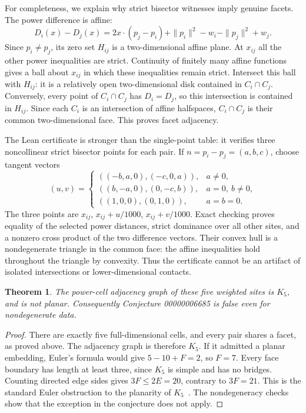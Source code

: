 \documentclass[11pt]{article}
\newtheorem{theorem}{Theorem}
\begin{document}
For completeness, we explain why strict bisector witnesses imply genuine facets. The power difference is affine:
\[
D_i(x)-D_j(x)=2x\cdot(p_j-p_i)
 +\|p_i\|^2-w_i-\|p_j\|^2+w_j.
\]
Since $p_i\ne p_j$, its zero set $H_{ij}$ is a two-dimensional affine plane. At $x_{ij}$ all the other power inequalities are strict. Continuity of finitely many affine functions gives a ball about $x_{ij}$ in which these inequalities remain strict. Intersect this ball with $H_{ij}$: it is a relatively open two-dimensional disk contained in $C_i\cap C_j$. Conversely, every point of $C_i\cap C_j$ has $D_i=D_j$, so this intersection is contained in $H_{ij}$. Since each $C_i$ is an intersection of affine halfspaces, $C_i\cap C_j$ is their common two-dimensional face. This proves facet adjacency.

The Lean certificate is stronger than the single-point table: it verifies three noncollinear strict bisector points for each pair. If $n=p_i-p_j=(a,b,c)$, choose tangent vectors
\[
(u,v)=
\begin{cases}
((-b,a,0),(-c,0,a)),&a\ne0,\\
((b,-a,0),(0,-c,b)),&a=0,\ b\ne0,\\
((1,0,0),(0,1,0)),&a=b=0.
\end{cases}
\]
The three points are $x_{ij}$, $x_{ij}+u/1000$, $x_{ij}+v/1000$.
Exact checking proves equality of the selected power distances, strict dominance over all other sites, and a nonzero cross product of the two difference vectors. Their convex hull is a nondegenerate triangle in the common face: the affine inequalities hold throughout the triangle by convexity. Thus the certificate cannot be an artifact of isolated intersections or lower-dimensional contacts.

\begin{theorem}
The power-cell adjacency graph of these five weighted sites is $K_5$, and is not planar. Consequently Conjecture 00000006685 is false even for nondegenerate data.
\end{theorem}
\begin{proof}
There are exactly five full-dimensional cells, and every pair shares a facet, as proved above. The adjacency graph is therefore $K_5$. If it admitted a planar embedding, Euler's formula would give $5-10+F=2$, so $F=7$. Every face boundary has length at least three, since $K_5$ is simple and has no bridges. Counting directed edge sides gives $3F\le2E=20$, contrary to $3F=21$. This is the standard Euler obstruction to the planarity of $K_5$~\cite{mit}. The nondegeneracy checks show that the exception in the conjecture does not apply.
\end{proof}
\end{document}
